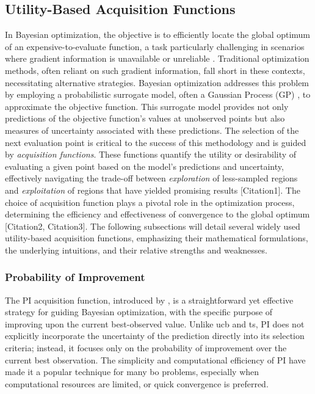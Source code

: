 \subsection{Utility-Based Acquisition Functions}
\label{section:acquisition_functions}

In Bayesian optimization, the objective is to efficiently locate the global optimum of an expensive-to-evaluate function, a task particularly challenging in scenarios where gradient information is unavailable or unreliable \citep{mockus1978application,jones1998efficient}. Traditional optimization methods, often reliant on such gradient information, fall short in these contexts, necessitating alternative strategies. Bayesian optimization addresses this problem by employing a probabilistic surrogate model, often a Gaussian Process (GP) \citep{rasmussen2006gaussian}, to approximate the objective function. This surrogate model provides not only predictions of the objective function's values at unobserved points but also measures of uncertainty associated with these predictions. The selection of the next evaluation point is critical to the success of this methodology and is guided by \textit{acquisition functions}. These functions quantify the utility or desirability of evaluating a given point based on the model’s predictions and uncertainty, effectively navigating the trade-off between \textit{exploration} of less-sampled regions and \textit{exploitation} of regions that have yielded promising results [Citation1].  The choice of acquisition function plays a pivotal role in the optimization process, determining the efficiency and effectiveness of convergence to the global optimum [Citation2, Citation3]. The following subsections will detail several widely used utility-based acquisition functions, emphasizing their mathematical formulations, the underlying intuitions, and their relative strengths and weaknesses.
\subsubsection{Probability of Improvement}
\label{section:pi}

The \ac{PI} acquisition function, introduced by \citet{kushner1964new}, is a straightforward yet effective strategy for guiding Bayesian optimization, with the specific purpose of improving upon the current best-observed value. Unlike \ac{ucb} and \ac{ts}, \ac{PI} does not explicitly incorporate the uncertainty of the prediction directly into its selection criteria; instead, it focuses only on the probability of improvement over the current best observation. The simplicity and computational efficiency of \ac{PI} have made it a popular technique for many \ac{bo} problems, especially when computational resources are limited, or quick convergence is preferred.

